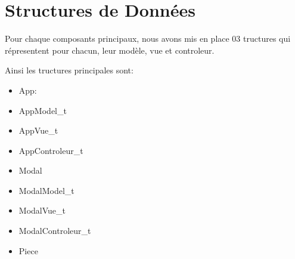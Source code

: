 \section{Structures de Données}\label{structures}

Pour chaque composants principaux, nous avons mis en place 03 tructures qui répresentent pour chacun,
leur modèle, vue et controleur.

Ainsi les tructures principales sont:
\begin{itemize}
    \item App:
    \item AppModel_t
    \item AppVue_t
    \item AppControleur_t
    \item Modal
    \item ModalModel_t
    \item ModalVue_t
    \item ModalControleur_t
    \item Piece
\end{itemize}
